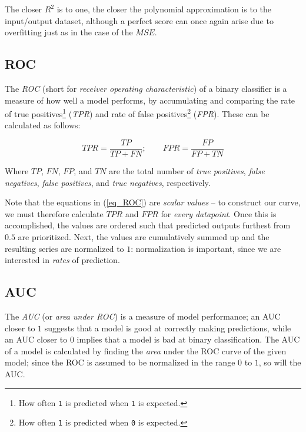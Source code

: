 \documentclass[a4paper,10pt,english]{article}
\begin{document}
\begin{multicols*}{2}
The closer $R^2$ is to one, the closer the polynomial approximation is to the input/output dataset, although a perfect score can once again arise due to overfitting just as in the case of the $MSE$.

\subsection*{ROC}

The \textit{ROC} (short for \textit{receiver operating characteristic}) of a binary classifier is a measure of how well a model performs, by accumulating and comparing the rate of true positives\footnote{How often \texttt{1} is predicted when \texttt{1} is expected.} (\textit{TPR})
 and rate of false positives\footnote{How often \texttt{1} is predicted when \texttt{0} is expected.} (\textit{FPR}). These can be calculated as follows:

\begin{equation}
\label{eq_ROC}
TPR = \frac{TP}{TP + FN}; \qquad FPR = \frac{FP}{FP + TN}
\end{equation}

Where $TP$, $FN$, $FP$, and $TN$ are the total number of \textit{true positives}, \textit{false negatives}, \textit{false positives}, and \textit{true negatives}, respectively.

Note that the equations in (\ref{eq_ROC}) are \textit{scalar values} – to construct our curve, we must therefore calculate $TPR$ and $FPR$ for \textit{every datapoint}. Once this is accomplished, the values are ordered such that predicted outputs furthest from $0.5$ are prioritized.  Next, the values are cumulatively summed up and the resulting series are normalized to $1$: normalization is important, since we are interested in \textit{rates} of prediction.

\subsection*{AUC}

The \textit{AUC} (or \textit{area under ROC}) is a measure of model performance; an AUC closer to $1$ suggests that a model is good at correctly making predictions, while an AUC closer to $0$ implies that a model is bad at binary classification.  The AUC of a model is calculated by finding the \textit{area} under the ROC curve of the given model; since the ROC is assumed to be normalized in the range $0$ to $1$, so will the AUC.


\end{multicols*}
\end{document}
